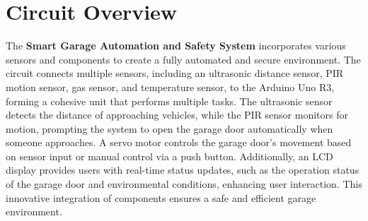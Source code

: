 \documentclass{article}
\begin{document}
\section{Circuit Overview}
The \textbf{Smart Garage Automation and Safety System} incorporates various sensors and components to create a fully automated and secure environment. The circuit connects multiple sensors, including an ultrasonic distance sensor, PIR motion sensor, gas sensor, and temperature sensor, to the Arduino Uno R3, forming a cohesive unit that performs multiple tasks. The ultrasonic sensor detects the distance of approaching vehicles, while the PIR sensor monitors for motion, prompting the system to open the garage door automatically when someone approaches. A servo motor controls the garage door's movement based on sensor input or manual control via a push button. Additionally, an LCD display provides users with real-time status updates, such as the operation status of the garage door and environmental conditions, enhancing user interaction. This innovative integration of components ensures a safe and efficient garage environment.
\end{document}
